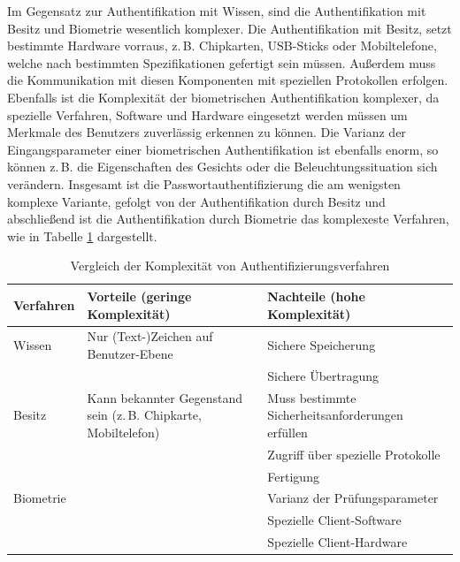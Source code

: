 \documentclass[11pt,a4paper,ngerman]{scrreprt}
\begin{document}
Im Gegensatz zur Authentifikation mit Wissen, sind die Authentifikation mit Besitz und Biometrie wesentlich komplexer. Die Authentifikation mit Besitz, setzt bestimmte Hardware vorraus, z.\,B. Chipkarten, USB-Sticks oder Mobiltelefone, welche nach bestimmten Spezifikationen gefertigt sein müssen. Außerdem muss die Kommunikation mit diesen Komponenten mit speziellen Protokollen erfolgen. Ebenfalls ist die Komplexität der biometrischen Authentifikation komplexer, da spezielle Verfahren, Software und Hardware eingesetzt werden müssen um Merkmale des Benutzers zuverlässig erkennen zu können. Die Varianz der Eingangsparameter einer biometrischen Authentifikation ist ebenfalls enorm, so können z.\,B. die Eigenschaften des Gesichts oder die Beleuchtungssituation sich verändern. Insgesamt ist die Passwortauthentifizierung die am wenigsten komplexe Variante, gefolgt von der Authentifikation durch Besitz und abschließend ist die Authentifikation durch Biometrie das komplexeste Verfahren, wie in Tabelle \ref{table:Komplexität} dargestellt.
\begin{table}[htbp]
    \begin{tabularx}{\textwidth}{ lXX }
        \toprule
        Verfahren & Vorteile (geringe Komplexität) & Nachteile (hohe Komplexität) \\ 
        \midrule
        Wissen & Nur (Text-)Zeichen auf Benutzer-Ebene & Sichere Speicherung \\
         & & Sichere Übertragung \\
        \midrule
        Besitz & Kann bekannter Gegenstand sein (z.\,B. Chipkarte, Mobiltelefon) & Muss bestimmte Sicherheitsanforderungen erfüllen \\
         & & Zugriff über spezielle Protokolle \\
         & & Fertigung \\
        \midrule
        Biometrie & & Varianz der Prüfungsparameter \\
         & & Spezielle Client-Software \\
         & & Spezielle Client-Hardware \\
        \bottomrule
    \end{tabularx}
    \caption{Vergleich der Komplexität von Authentifizierungsverfahren}
    \label{table:Komplexität}
\end{table}
\end{document}
